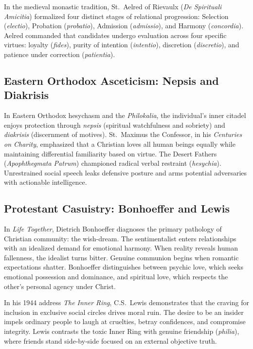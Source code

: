 \documentclass[11pt,twocolumn]{article}
\begin{document}
In the medieval monastic tradition, St.~Aelred of Rievaulx (\textit{De Spirituali Amicitia}) formalized four distinct stages of relational progression: Selection (\textit{electio}), Probation (\textit{probatio}), Admission (\textit{admissio}), and Harmony (\textit{concordia}). Aelred commanded that candidates undergo evaluation across four specific virtues: loyalty (\textit{fides}), purity of intention (\textit{intentio}), discretion (\textit{discretio}), and patience under correction (\textit{patientia}).

\subsection{Eastern Orthodox Asceticism: Nepsis and Diakrisis}
In Eastern Orthodox hesychasm and the \textit{Philokalia}, the individual's inner citadel enjoys protection through \textit{nepsis} (spiritual watchfulness and sobriety) and \textit{diakrisis} (discernment of motives). St.~Maximus the Confessor, in his \textit{Centuries on Charity}, emphasized that a Christian loves all human beings equally while maintaining differential familiarity based on virtue. The Desert Fathers (\textit{Apophthegmata Patrum}) championed radical verbal restraint (\textit{hesychia}). Unrestrained social speech leaks defensive posture and arms potential adversaries with actionable intelligence.

\subsection{Protestant Casuistry: Bonhoeffer and Lewis}
In \textit{Life Together}, Dietrich Bonhoeffer diagnoses the primary pathology of Christian community: the wish-dream. The sentimentalist enters relationships with an idealized demand for emotional harmony. When reality reveals human fallenness, the idealist turns bitter. Genuine communion begins when romantic expectations shatter. Bonhoeffer distinguishes between psychic love, which seeks emotional possession and dominance, and spiritual love, which respects the other's personal agency under Christ.

In his 1944 address \textit{The Inner Ring}, C.S.~Lewis demonstrates that the craving for inclusion in exclusive social circles drives moral ruin. The desire to be an insider impels ordinary people to laugh at cruelties, betray confidences, and compromise integrity. Lewis contrasts the toxic Inner Ring with genuine friendship (\textit{philia}), where friends stand side-by-side focused on an external objective truth.
\end{document}
